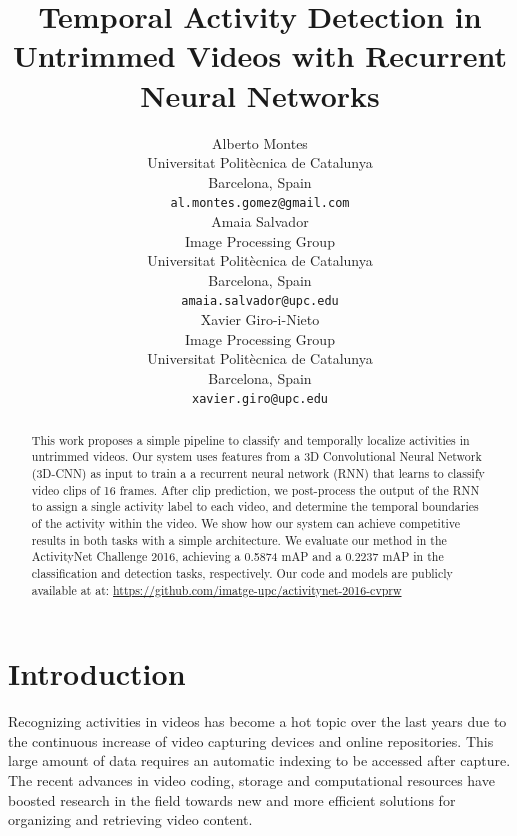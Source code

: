 \documentclass{article}
\title{Temporal Activity Detection in Untrimmed Videos with Recurrent Neural Networks}
\author{
    Alberto Montes \\
    Universitat Politècnica de Catalunya \\
    Barcelona, Spain \\
    \texttt{al.montes.gomez@gmail.com} \\
    \And
    Amaia Salvador \\
    Image Processing Group \\
    Universitat Politècnica de Catalunya \\
    Barcelona, Spain \\
    \texttt{amaia.salvador@upc.edu} \\
    \And
    Xavier Giro-i-Nieto \\
    Image Processing Group \\
    Universitat Politècnica de Catalunya \\
    Barcelona, Spain \\
    \texttt{xavier.giro@upc.edu} \\
}
\begin{document}

\maketitle

\begin{abstract}


    This work proposes a simple pipeline to classify and temporally localize activities in untrimmed videos. Our system uses features from a 3D Convolutional Neural Network (3D-CNN) as input to train a a recurrent neural network (RNN) that learns to classify video clips of 16 frames. After clip prediction, we post-process the output of the RNN to assign a single activity label to each video, and determine the temporal boundaries of the activity within the video. We show how our system can achieve competitive results in both tasks with a simple architecture. We evaluate our method in the ActivityNet Challenge 2016, achieving a 0.5874 mAP and a 0.2237 mAP in the classification and detection tasks, respectively. Our code and models are publicly available at at: \url{https://github.com/imatge-upc/activitynet-2016-cvprw}

\end{abstract}

\section{Introduction}

Recognizing activities in videos has become a hot topic over the last years due to the continuous increase of video capturing devices and online repositories.
This large amount of data requires an automatic indexing to be accessed after capture.
The recent advances in video coding, storage and computational resources have boosted research in the field towards new and more efficient solutions for organizing and retrieving video content.
\end{document}

